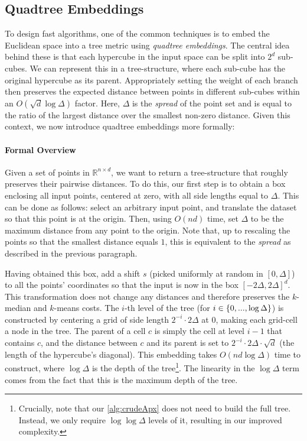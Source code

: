 \subsection{Quadtree Embeddings}

To design fast algorithms, one of the common techniques is to embed the Euclidean space into a tree metric using \emph{quadtree embeddings}.  The central idea
behind these is that each hypercube in the input space can be split into $2^d$ sub-cubes. We can represent this in a tree-structure, where each sub-cube has the
original hypercube as its parent. Appropriately setting the weight of each branch then preserves the expected distance between points in different sub-cubes
within an $O(\sqrt{d} \log \Delta)$ factor. Here, $\Delta$ is the \emph{spread} of the point set and is equal to the ratio of the largest distance over the
smallest non-zero distance.  Given this context, we now introduce quadtree embeddings more formally:

\paragraph*{Formal Overview}

Given a set of points in $\mathbb{R}^{n \times d}$, we want to return a tree-structure that roughly preserves their pairwise distances.  To do this, our first
step is to obtain a box enclosing all input points, centered at zero, with all side lengths equal to $\Delta$. This can be done as follows: select an arbitrary
input point, and translate the dataset so that this point is at the origin. Then, using $O(nd)$ time, set $\Delta$ to be the maximum distance from any point to
the origin. Note that, up to rescaling the points so that the smallest distance equals $1$, this is equivalent to the \emph{spread} as described in the previous
paragraph.

Having obtained this box, add a shift $s$ (picked uniformly at random in $[0, \Delta]$) to all the points' coordinates so that the input is now in the box
$[-2\Delta, 2\Delta]^d$. This transformation does not change any distances and therefore preserves the $k$-median and $k$-means costs.  The $i$-th level of the
tree (for $i \in \left\{ 0, ..., \log \Delta \right\}$) is constructed by centering a grid of side length $2^{-i} \cdot 2\Delta$ at $0$, making each grid-cell a node
in the tree.  The parent of a cell $c$ is simply the cell at level $i-1$ that contains $c$, and the distance between $c$ and its parent is set to $2^{-i} \cdot
2\Delta \cdot \sqrt{d}$ (the length of the hypercube's diagonal). This embedding takes $O(nd \log \Delta)$ time to construct, where $\log \Delta$ is the depth
of the tree\footnote{Crucially, note that our \cref{alg:crudeApx} does not need to build the full tree. Instead, we only require $\log \log \Delta$
levels of it, resulting in our improved complexity.}. The linearity in the $\log \Delta$ term comes from the fact that this is the maximum depth of the tree.

